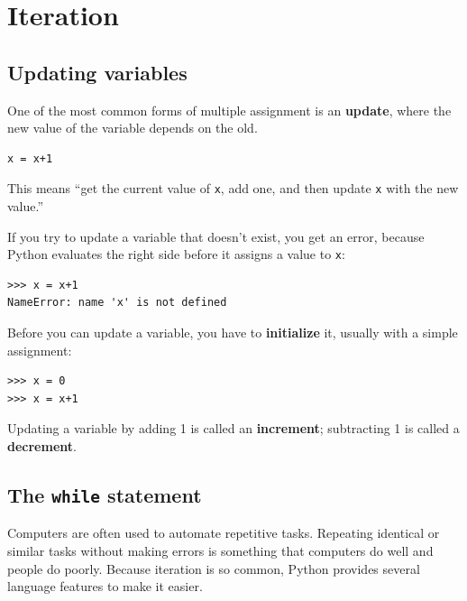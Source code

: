 \documentclass[10pt]{book}
\begin{document}
\chapter{Iteration}


\section{Updating variables}
\label{update}


One of the most common forms of multiple assignment is an {\bf update},
where the new value of the variable depends on the old.

\beforeverb
\begin{verbatim}
x = x+1
\end{verbatim}
\afterverb
%
This means ``get the current value of {\tt x}, add one, and then
update {\tt x} with the new value.''

If you try to update a variable that doesn't exist, you get an
error, because Python evaluates the right side before it assigns
a value to {\tt x}:

\beforeverb
\begin{verbatim}
>>> x = x+1
NameError: name 'x' is not defined
\end{verbatim}
\afterverb
%
Before you can update a variable, you have to {\bf initialize}
it, usually with a simple assignment:


\beforeverb
\begin{verbatim}
>>> x = 0
>>> x = x+1
\end{verbatim}
\afterverb
%
Updating a variable by adding 1 is called an {\bf increment};
subtracting 1 is called a {\bf decrement}.


\section{The {\tt while} statement}


Computers are often used to automate repetitive tasks.  Repeating
identical or similar tasks without making errors is something that
computers do well and people do poorly.
Because iteration is so common, Python provides several
language features to make it easier.  
\end{document}
